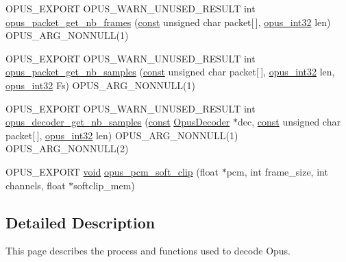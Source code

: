 \begin{DoxyCompactItemize}
\item 
O\+P\+U\+S\+\_\+\+E\+X\+P\+O\+RT O\+P\+U\+S\+\_\+\+W\+A\+R\+N\+\_\+\+U\+N\+U\+S\+E\+D\+\_\+\+R\+E\+S\+U\+LT int \hyperlink{group__opus__decoder_ga932edb5fbae85cf452650ef390f52849}{opus\+\_\+packet\+\_\+get\+\_\+nb\+\_\+frames} (\hyperlink{zconf_8h_a2c212835823e3c54a8ab6d95c652660e}{const} unsigned char packet\mbox{[}$\,$\mbox{]}, \hyperlink{opus__types_8h_aa4d309d6f80b99dbabebc8f98879ab9a}{opus\+\_\+int32} len) O\+P\+U\+S\+\_\+\+A\+R\+G\+\_\+\+N\+O\+N\+N\+U\+LL(1)
\item 
O\+P\+U\+S\+\_\+\+E\+X\+P\+O\+RT O\+P\+U\+S\+\_\+\+W\+A\+R\+N\+\_\+\+U\+N\+U\+S\+E\+D\+\_\+\+R\+E\+S\+U\+LT int \hyperlink{group__opus__decoder_gacfb7a57368d5453a8a9c03460d9789b5}{opus\+\_\+packet\+\_\+get\+\_\+nb\+\_\+samples} (\hyperlink{zconf_8h_a2c212835823e3c54a8ab6d95c652660e}{const} unsigned char packet\mbox{[}$\,$\mbox{]}, \hyperlink{opus__types_8h_aa4d309d6f80b99dbabebc8f98879ab9a}{opus\+\_\+int32} len, \hyperlink{opus__types_8h_aa4d309d6f80b99dbabebc8f98879ab9a}{opus\+\_\+int32} Fs) O\+P\+U\+S\+\_\+\+A\+R\+G\+\_\+\+N\+O\+N\+N\+U\+LL(1)
\item 
O\+P\+U\+S\+\_\+\+E\+X\+P\+O\+RT O\+P\+U\+S\+\_\+\+W\+A\+R\+N\+\_\+\+U\+N\+U\+S\+E\+D\+\_\+\+R\+E\+S\+U\+LT int \hyperlink{group__opus__decoder_ga34c90825f85af209160d459bafaa21c5}{opus\+\_\+decoder\+\_\+get\+\_\+nb\+\_\+samples} (\hyperlink{zconf_8h_a2c212835823e3c54a8ab6d95c652660e}{const} \hyperlink{group__opus__decoder_ga401d8579958d36094715a6b90cd159a6}{Opus\+Decoder} $\ast$dec, \hyperlink{zconf_8h_a2c212835823e3c54a8ab6d95c652660e}{const} unsigned char packet\mbox{[}$\,$\mbox{]}, \hyperlink{opus__types_8h_aa4d309d6f80b99dbabebc8f98879ab9a}{opus\+\_\+int32} len) O\+P\+U\+S\+\_\+\+A\+R\+G\+\_\+\+N\+O\+N\+N\+U\+LL(1) O\+P\+U\+S\+\_\+\+A\+R\+G\+\_\+\+N\+O\+N\+N\+U\+LL(2)
\item 
O\+P\+U\+S\+\_\+\+E\+X\+P\+O\+RT \hyperlink{png_8h_ac9c84fa68bbad002983e35ce3663c686}{void} \hyperlink{group__opus__decoder_ga97cfcb7d4577df585955d4076b1ac717}{opus\+\_\+pcm\+\_\+soft\+\_\+clip} (float $\ast$pcm, int frame\+\_\+size, int channels, float $\ast$softclip\+\_\+mem)
\end{DoxyCompactItemize}


\subsection{Detailed Description}
This page describes the process and functions used to decode Opus. 

